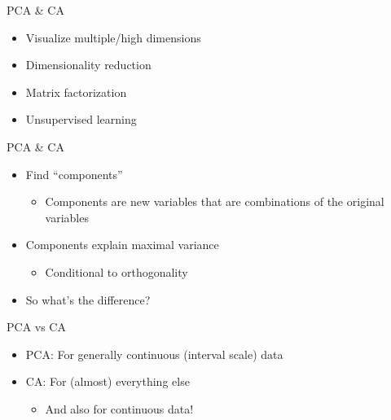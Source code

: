 \documentclass[
  ignorenonframetext,
]{beamer}
\providecommand{\tightlist}{%
  \setlength{\itemsep}{0pt}\setlength{\parskip}{0pt}}
\begin{document}
\begin{frame}{PCA \& CA}
\protect\hypertarget{pca-ca-1}{}

\begin{itemize}[<+->]
\tightlist
\item
  Visualize multiple/high dimensions
\item
  Dimensionality reduction
\item
  Matrix factorization
\item
  Unsupervised learning
\end{itemize}

\end{frame}

\begin{frame}{PCA \& CA}
\protect\hypertarget{pca-ca-2}{}

\begin{itemize}[<+->]
\tightlist
\item
  Find ``components''

  \begin{itemize}[<+->]
  \tightlist
  \item
    Components are new variables that are combinations of the original
    variables
  \end{itemize}
\item
  Components explain maximal variance

  \begin{itemize}[<+->]
  \tightlist
  \item
    Conditional to orthogonality
  \end{itemize}
\item
  So what's the difference?
\end{itemize}

\end{frame}

\begin{frame}{PCA vs CA}
\protect\hypertarget{pca-vs-ca}{}

\begin{itemize}[<+->]
\tightlist
\item
  PCA: For generally continuous (interval scale) data
\item
  CA: For (almost) everything else

  \begin{itemize}[<+->]
  \tightlist
  \item
    And also for continuous data!
  \end{itemize}
\end{itemize}

\end{frame}
\end{document}
